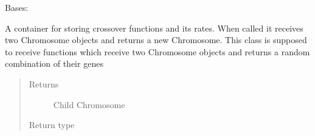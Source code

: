 \documentclass[letterpaper,10pt,english]{sphinxmanual}
\begin{document}
\begin{fulllineitems}
\label{\detokenize{MolOpt.genetic:MolOpt.genetic.genetic.Crossover}}
\sphinxAtStartPar
Bases: 

\sphinxAtStartPar
A container for storing crossover functions and its rates. When called it receives two Chromosome objects and 
returns a new Chromosome. This class is supposed to receive functions which receive two Chromosome objects and 
returns a random combination of their genes
\begin{quote}\begin{description}
\item[{Returns}] \leavevmode
\sphinxAtStartPar
Child Chromosome

\item[{Return type}] \leavevmode
\sphinxAtStartPar
{\hyperref[\detokenize{MolOpt.genetic:MolOpt.genetic.genetic.Chromosome}]{}}

\end{description}\end{quote}

\end{fulllineitems}

\end{document}
